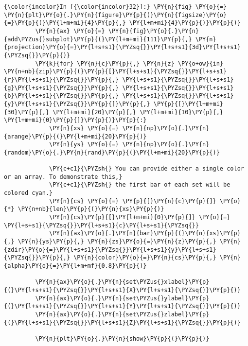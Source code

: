     \begin{Verbatim}[commandchars=\\\{\}]
{\color{incolor}In [{\color{incolor}32}]:} \PY{n}{fig} \PY{o}{=} \PY{n}{plt}\PY{o}{.}\PY{n}{figure}\PY{p}{(}\PY{n}{figsize}\PY{o}{=}\PY{p}{(}\PY{l+m+mi}{4}\PY{p}{,} \PY{l+m+mi}{4}\PY{p}{)}\PY{p}{)}
         \PY{n}{ax} \PY{o}{=} \PY{n}{fig}\PY{o}{.}\PY{n}{add\PYZus{}subplot}\PY{p}{(}\PY{l+m+mi}{111}\PY{p}{,} \PY{n}{projection}\PY{o}{=}\PY{l+s+s1}{\PYZsq{}}\PY{l+s+s1}{3d}\PY{l+s+s1}{\PYZsq{}}\PY{p}{)}
         \PY{k}{for} \PY{n}{c}\PY{p}{,} \PY{n}{z} \PY{o+ow}{in} \PY{n+nb}{zip}\PY{p}{(}\PY{p}{[}\PY{l+s+s1}{\PYZsq{}}\PY{l+s+s1}{r}\PY{l+s+s1}{\PYZsq{}}\PY{p}{,} \PY{l+s+s1}{\PYZsq{}}\PY{l+s+s1}{g}\PY{l+s+s1}{\PYZsq{}}\PY{p}{,} \PY{l+s+s1}{\PYZsq{}}\PY{l+s+s1}{b}\PY{l+s+s1}{\PYZsq{}}\PY{p}{,} \PY{l+s+s1}{\PYZsq{}}\PY{l+s+s1}{y}\PY{l+s+s1}{\PYZsq{}}\PY{p}{]}\PY{p}{,} \PY{p}{[}\PY{l+m+mi}{30}\PY{p}{,} \PY{l+m+mi}{20}\PY{p}{,} \PY{l+m+mi}{10}\PY{p}{,} \PY{l+m+mi}{0}\PY{p}{]}\PY{p}{)}\PY{p}{:}
             \PY{n}{xs} \PY{o}{=} \PY{n}{np}\PY{o}{.}\PY{n}{arange}\PY{p}{(}\PY{l+m+mi}{20}\PY{p}{)}
             \PY{n}{ys} \PY{o}{=} \PY{n}{np}\PY{o}{.}\PY{n}{random}\PY{o}{.}\PY{n}{rand}\PY{p}{(}\PY{l+m+mi}{20}\PY{p}{)}
         
             \PY{c+c1}{\PYZsh{} You can provide either a single color or an array. To demonstrate this,}
             \PY{c+c1}{\PYZsh{} the first bar of each set will be colored cyan.}
             \PY{n}{cs} \PY{o}{=} \PY{p}{[}\PY{n}{c}\PY{p}{]} \PY{o}{*} \PY{n+nb}{len}\PY{p}{(}\PY{n}{xs}\PY{p}{)}
             \PY{n}{cs}\PY{p}{[}\PY{l+m+mi}{0}\PY{p}{]} \PY{o}{=} \PY{l+s+s1}{\PYZsq{}}\PY{l+s+s1}{c}\PY{l+s+s1}{\PYZsq{}}
             \PY{n}{ax}\PY{o}{.}\PY{n}{bar}\PY{p}{(}\PY{n}{xs}\PY{p}{,} \PY{n}{ys}\PY{p}{,} \PY{n}{zs}\PY{o}{=}\PY{n}{z}\PY{p}{,} \PY{n}{zdir}\PY{o}{=}\PY{l+s+s1}{\PYZsq{}}\PY{l+s+s1}{y}\PY{l+s+s1}{\PYZsq{}}\PY{p}{,} \PY{n}{color}\PY{o}{=}\PY{n}{cs}\PY{p}{,} \PY{n}{alpha}\PY{o}{=}\PY{l+m+mf}{0.8}\PY{p}{)}
         
         \PY{n}{ax}\PY{o}{.}\PY{n}{set\PYZus{}xlabel}\PY{p}{(}\PY{l+s+s1}{\PYZsq{}}\PY{l+s+s1}{X}\PY{l+s+s1}{\PYZsq{}}\PY{p}{)}
         \PY{n}{ax}\PY{o}{.}\PY{n}{set\PYZus{}ylabel}\PY{p}{(}\PY{l+s+s1}{\PYZsq{}}\PY{l+s+s1}{Y}\PY{l+s+s1}{\PYZsq{}}\PY{p}{)}
         \PY{n}{ax}\PY{o}{.}\PY{n}{set\PYZus{}zlabel}\PY{p}{(}\PY{l+s+s1}{\PYZsq{}}\PY{l+s+s1}{Z}\PY{l+s+s1}{\PYZsq{}}\PY{p}{)}
         
         \PY{n}{plt}\PY{o}{.}\PY{n}{show}\PY{p}{(}\PY{p}{)}
\end{Verbatim}


